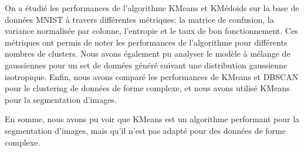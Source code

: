 \documentclass[french,a4paper,18pt]{article}
\begin{document}
On a étudié les performances de l'algorithme KMeans et KMédoids sur la base de données MNIST 
à travers différentes métriques: la matrice de confusion, la variance normalisée par colonne, l'entropie et le taux de bon fonctionnement.
Ces métriques ont permis de noter les performances de l'algorithme pour différents nombres de clusters.
Nous avons également pu analyser le modèle à mélange de gaussiennes pour un set de données généré suivant une distribution gaussienne isotropique.
Enfin, nous avons comparé les performances de KMeans et DBSCAN pour le clustering de données de forme complexe, et nous avons utilisé KMeans pour la segmentation d'images.

En somme, nous avons pu voir que KMeans est un algorithme performant pour la segmentation d'images, mais qu'il n'est pas adapté pour des données de forme complexe.
\end{document}

